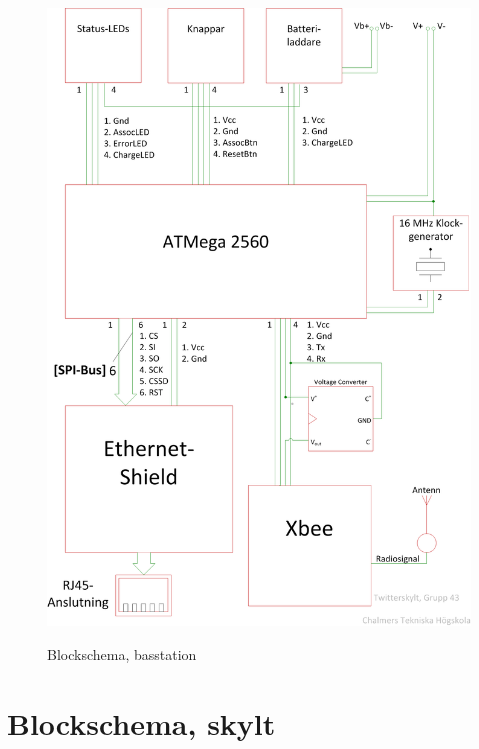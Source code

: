 \documentclass[a4paper,11pt]{article}
\begin{document}
\begin{figure}[H]
\includegraphics[scale=0.6, angle=0]{block_bas.png}
\label{fig:block_bas}
\caption{Blockschema, basstation}
\end{figure}
\pagebreak

\section{Blockschema, skylt}
\end{document}
